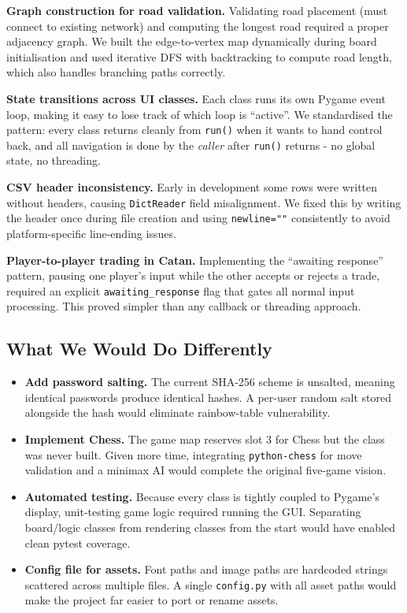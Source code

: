 \documentclass[12pt,a4paper]{article}
\begin{document}
\textbf{Graph construction for road validation.}
Validating road placement (must connect to existing network) and computing the longest road required a proper adjacency graph. We built the edge-to-vertex map dynamically during board initialisation and used iterative DFS with backtracking to compute road length, which also handles branching paths correctly.

\textbf{State transitions across UI classes.}
Each class runs its own Pygame event loop, making it easy to lose track of which loop is ``active''. We standardised the pattern: every class returns cleanly from \texttt{run()} when it wants to hand control back, and all navigation is done by the \textit{caller} after \texttt{run()} returns - no global state, no threading.

\textbf{CSV header inconsistency.}
Early in development some rows were written without headers, causing \texttt{DictReader} field misalignment. We fixed this by writing the header once during file creation and using \texttt{newline=""} consistently to avoid platform-specific line-ending issues.

\textbf{Player-to-player trading in Catan.}
Implementing the ``awaiting response'' pattern, pausing one player's input while the other accepts or rejects a trade, required an explicit \texttt{awaiting\_response} flag that gates all normal input processing. This proved simpler than any callback or threading approach.

\subsection{What We Would Do Differently}

\begin{itemize}[leftmargin=2em]
  \item \textbf{Add password salting.} The current SHA-256 scheme is unsalted, meaning identical passwords produce identical hashes. A per-user random salt stored alongside the hash would eliminate rainbow-table vulnerability.
  \item \textbf{Implement Chess.} The game map reserves slot 3 for Chess but the class was never built. Given more time, integrating \texttt{python-chess} for move validation and a minimax AI would complete the original five-game vision.
  \item \textbf{Automated testing.} Because every class is tightly coupled to Pygame's display, unit-testing game logic required running the GUI. Separating board/logic classes from rendering classes from the start would have enabled clean pytest coverage.
  \item \textbf{Config file for assets.} Font paths and image paths are hardcoded strings scattered across multiple files. A single \texttt{config.py} with all asset paths would make the project far easier to port or rename assets.
\end{itemize}
\end{document}
